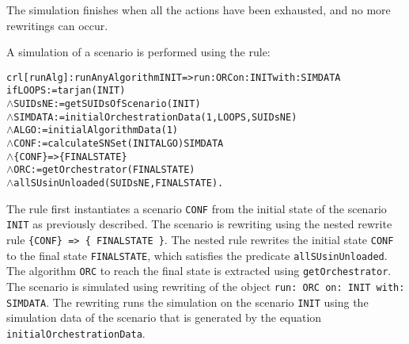 The simulation finishes when all the actions have been exhausted, and no more rewritings can occur.

A simulation of a scenario is performed using the rule:
\small
\begin{alltt}
crl [runAlg] : runAnyAlgorithm INIT => run: ORC on: INIT with: SIMDATA
  if LOOPS := tarjan(INIT)
  \(\land\) SUIDsNE := getSUIDsOfScenario(INIT)
  \(\land\) SIMDATA := initialOrchestrationData(1,LOOPS,SUIDsNE)
  \(\land\) ALGO := initialAlgorithmData(1)
  \(\land\) CONF := calculateSNSet(INIT ALGO) SIMDATA 
  \(\land\) \{CONF\} => \{ FINALSTATE \} 
  \(\land\) ORC := getOrchestrator(FINALSTATE)
  \(\land\) allSUsinUnloaded(SUIDsNE, FINALSTATE) .
\end{alltt}
\normalsize
The rule first instantiates a scenario \texttt{CONF} from the initial state of the scenario \texttt{INIT} as previously described.
The scenario is rewriting using the nested rewrite rule \texttt{\{CONF\} => \{ FINALSTATE \}}. 
The nested rule rewrites the initial state \texttt{CONF} to the final state \texttt{FINALSTATE}, which satisfies the predicate \texttt{allSUsinUnloaded}.
The algorithm \texttt{ORC} to reach the final state is extracted using \texttt{getOrchestrator}.
The scenario is simulated using rewriting of the object \texttt{run: ORC on: INIT with: SIMDATA}.
The rewriting runs the simulation on the scenario \texttt{INIT} using the simulation data of the scenario that is generated by the equation \texttt{initialOrchestrationData}.


